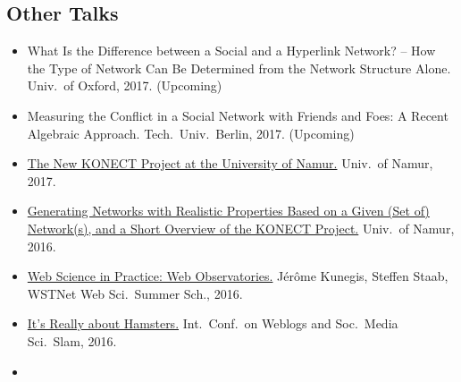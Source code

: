 \documentclass[line,mm]{res}
\newcounter{x}
\newcounter{y}
\newcommand{\talknumber}{T\arabic{y}\stepcounter{y}}
\begin{document}
\begin{resume}
\section{Other Talks}
\begin{itemize}
  \item[{[\talknumber]}]
    What Is the Difference between a Social and a Hyperlink Network?
    -- How the Type of Network Can Be Determined from the Network Structure
    Alone.
    Univ.\ of Oxford, 2017.  (Upcoming)
  \item[{[\talknumber]}]
    Measuring the Conflict in a Social Network with Friends and Foes:  A
    Recent Algebraic Approach.
    Tech.\ Univ.\ Berlin, 2017.  (Upcoming)
  \item[{[\talknumber]}] 
    \href{https://github.com/kunegis/pdfs/blob/master/kunegis:konect-namur.presentation.pdf}{The
      New KONECT Project at the University of Namur.}
    Univ.\ of Namur, 2017. 
  \item[{[\talknumber]}] 
    \href{https://github.com/kunegis/pdfs/blob/master/kunegis:graph-generator-namur.presentation.pdf}{Generating
      Networks with Realistic Properties Based on a 
    Given (Set of) Network(s), and a Short Overview of the KONECT
    Project.}  Univ.\ of Namur, 2016. 
  \item[{[\talknumber]}] 
    \href{https://github.com/kunegis/pdfs/blob/master/kunegis:web-observatories.presentation.pdf}{Web Science in Practice:  Web Observatories.}  
    Jérôme Kunegis, Steffen Staab, WSTNet Web Sci.\ Summer Sch., 2016.  
  \item[{[\talknumber]}]
    \href{https://www.slideshare.net/kunegis/science-slam-by-jrme-kunegis-icwsm-2016}{It's Really about Hamsters.}
    Int.\ Conf.\ on Weblogs and Soc.\ Media Sci.\ Slam, 2016. 
  \item[{[\talknumber]}] 

\end{itemize}
\end{resume}
\end{document}
